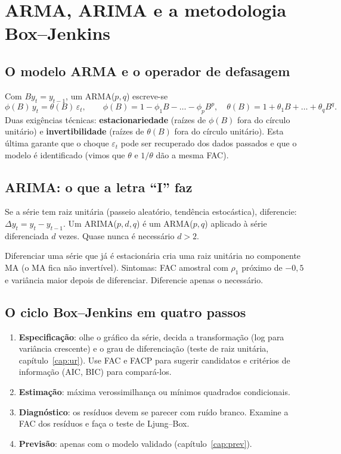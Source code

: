 \chapter{ARMA, ARIMA e a metodologia Box--Jenkins}
\label{cap:arma}

\section{O modelo ARMA e o operador de defasagem}
Com $B y_t=y_{t-1}$, um ARMA($p,q$) escreve-se
\[
\phi(B)\,y_t=\theta(B)\,\varepsilon_t,\qquad \phi(B)=1-\phi_1B-\dots-\phi_pB^p,\quad \theta(B)=1+\theta_1B+\dots+\theta_qB^q.
\]
Duas exigências técnicas: \textbf{estacionariedade} (raízes de $\phi(B)$ fora do círculo unitário) e \textbf{invertibilidade} (raízes de $\theta(B)$ fora do círculo unitário). Esta última garante que o choque $\varepsilon_t$ pode ser recuperado dos dados passados e que o modelo é identificado (vimos que $\theta$ e $1/\theta$ dão a mesma FAC).

\section{ARIMA: o que a letra ``I'' faz}
Se a série tem raiz unitária (passeio aleatório, tendência estocástica), diferencie: $\Delta y_t=y_t-y_{t-1}$. Um ARIMA($p,d,q$) é um ARMA($p,q$) aplicado à série diferenciada $d$ vezes. Quase nunca é necessário $d>2$.

\begin{atencao}[{Superdiferenciação}]
Diferenciar uma série que já é estacionária cria uma raiz unitária no componente MA (o MA fica não invertível). Sintomas: FAC amostral com $\rho_1$ próximo de $-0{,}5$ e variância maior depois de diferenciar. Diferencie apenas o necessário.
\end{atencao}

\section{O ciclo Box--Jenkins em quatro passos}
\begin{enumerate}[leftmargin=1.6em]
\item \textbf{Especificação}: olhe o gráfico da série, decida a transformação (log para variância crescente) e o grau de diferenciação (teste de raiz unitária, capítulo~\ref{cap:ur}). Use FAC e FACP para sugerir candidatos e critérios de informação (AIC, BIC) para compará-los.
\item \textbf{Estimação}: máxima verossimilhança ou mínimos quadrados condicionais.
\item \textbf{Diagnóstico}: os resíduos devem se parecer com ruído branco. Examine a FAC dos resíduos e faça o teste de Ljung--Box.
\item \textbf{Previsão}: apenas com o modelo validado (capítulo~\ref{cap:prev}).
\end{enumerate}

